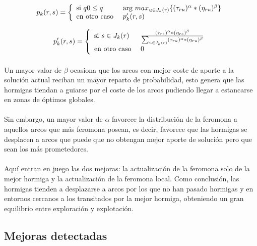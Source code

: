 	\begin{equation}
	p_{k}(r,s)= \left\lbrace
	\begin{array}{ll}
	\textup{si } q0 \leq q & \textup{arg }max_{u \in J_{k}(r)}\{(\tau_{ru})^{\alpha}*(\eta_{ru})^{\beta}\}\\
	\textup{en otro caso } & p'_{k}(r,s)
	\end{array}
	\right.
	\end{equation}
	
	\begin{equation}
	p'_{k}(r,s)= \left\lbrace
	\begin{array}{ll}
	\textup{si } s \in J_{k}(r) & \frac{(\tau_{rs})^{\alpha}*(\eta_{rs})^{\beta}}{\sum_{u \in J_{k}(r)}(\tau_{ru})^{\alpha}*(\eta_{ru})^{\beta}}\\
	\textup{en otro caso } & 0
	\end{array}
	\right.
	\end{equation}
	
	\paragraph{}Un mayor valor de $\beta$ ocasiona que los arcos con mejor coste de aporte a la solución actual reciban un mayor reparto de probabilidad, esto genera que las hormigas tiendan a guiarse por el coste de los arcos pudiendo llegar a estancarse en zonas de óptimos globales.
	
	\paragraph{}Sin embargo, un mayor valor de $\alpha$ favorece la distribución de la feromona a aquellos arcos que más feromona posean, es decir, favorece que las hormigas se desplacen a arcos que puede que no obtengan mejor aporte de solución pero que sean los más prometedores. 
	
	\paragraph{}Aquí entran en juego las dos mejoras: la actualización de la feromona solo de la mejor hormiga y la actualización de la feromona local. Como conclusión, las hormigas tienden a desplazarse a arcos por los que no han pasado hormigas y en entornos cercanos a los transitados por la mejor hormiga, obteniendo un gran equilibrio entre exploración y explotación.
	
	\subsection{Mejoras detectadas}
	
